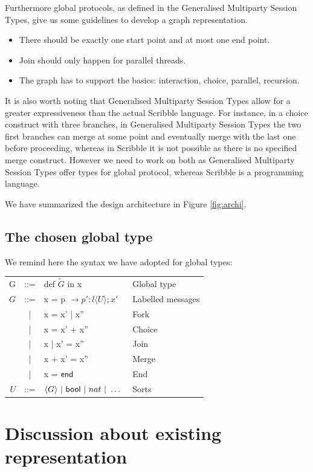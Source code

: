 \documentclass[a4paper,11pt,twoside]{report}
\newcommand{\kf}[1]{\textup{\textsf{#1}}\xspace}
\newcommand{\G}{\ensuremath{G}}
\newcommand{\UT}{\ensuremath{U}}
\newcommand{\End}{\kf{end}}
\newcommand{\Bool}{\kf{bool}}
\begin{document}
Furthermore global protocols, as defined in the Generalised Multiparty Session Types, give us some guidelines to develop a graph representation.
\begin{itemize}
\item There should be exactly one start point and at most one end point.
\item Join should only happen for parallel threads.
\item The graph has to support the basics: interaction, choice, parallel, recursion.
\end{itemize}
It is also worth noting that Generalised Multiparty Session Types allow for a greater expressiveness than the actual Scribble language. For instance, in a choice construct with three branches, in Generalised Multiparty Session Types the two first branches can merge at some point and eventually merge with the last one before proceeding, whereas in Scribble it is not possible as there is no specified merge construct. However we need to work on both as Generalised Multiparty Session Types offer types for global protocol, whereas Scribble is a programming language.

We have summarized the design architecture in Figure \ref{fig:archi}.


\subsection{The chosen global type}
We remind here the syntax we have adopted for global types:
\begin{center}
\begin{tabular}{rcll}
G & ::= & def $\tilde{\G}$ in x & Global type \\
$\G$ & ::= & x  = p $\rightarrow p' : l \langle \UT \rangle ;x' $ & Labelled messages\\
& | & x = x' | x'' & Fork\\
& | & x = x' + x'' & Choice\\
& | & x | x' = x'' & Join\\
& | & x + x' = x'' & Merge\\
& | & x = $\End$ & End\\
\UT & ::= &$ \langle G\rangle\ |\ \Bool\ |\ nat \ |\ \ldots\ $ & Sorts
\end{tabular}
\end{center}

\section{Discussion about existing representation}
\end{document}
